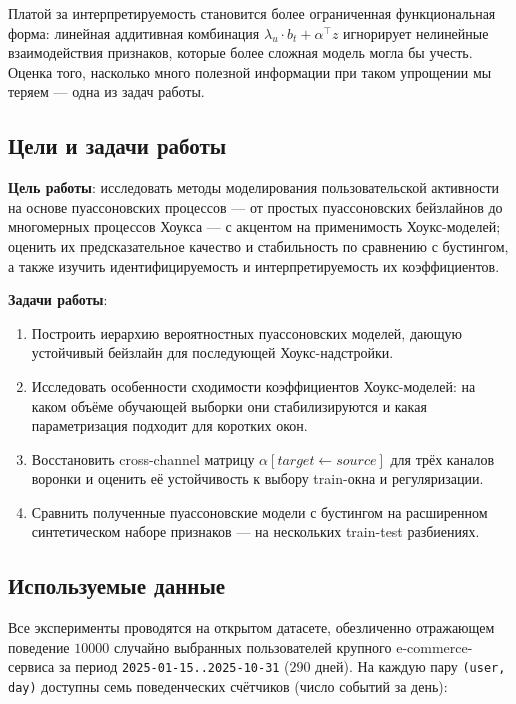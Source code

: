 \documentclass[12pt,a4paper]{article}
\begin{document}
Платой за интерпретируемость становится более ограниченная функциональная форма: линейная аддитивная комбинация $\lambda _u \cdot  b_t + \alpha ^{\top} z$ игнорирует нелинейные взаимодействия признаков, которые более сложная модель могла бы учесть. Оценка того, насколько много полезной информации при таком упрощении мы теряем --- одна из задач работы.

\FloatBarrier
\subsection{Цели и задачи работы}

\textbf{Цель работы}: исследовать методы моделирования пользовательской активности на основе пуассоновских процессов --- от простых пуассоновских бейзлайнов до многомерных процессов Хоукса --- с акцентом на применимость Хоукс-моделей; оценить их предсказательное качество и стабильность по сравнению с бустингом, а также изучить идентифицируемость и интерпретируемость их коэффициентов.

\textbf{Задачи работы}:

\begin{enumerate}
  \item Построить иерархию вероятностных пуассоновских моделей, дающую устойчивый бейзлайн для последующей Хоукс-надстройки.
  \item Исследовать особенности сходимости коэффициентов Хоукс-моделей: на каком объёме обучающей выборки они стабилизируются и какая параметризация подходит для коротких окон.
  \item Восстановить cross-channel матрицу $\alpha [target \leftarrow  source]$ для трёх каналов воронки и оценить её устойчивость к выбору train-окна и регуляризации.
  \item Сравнить полученные пуассоновские модели с бустингом на расширенном синтетическом наборе признаков --- на нескольких train-test разбиениях.
\end{enumerate}


\FloatBarrier
\subsection{Используемые данные}

Все эксперименты проводятся на открытом датасете, обезличенно отражающем поведение $10000$ случайно выбранных пользователей крупного e-commerce-сервиса за период \texttt{2025-01-15..2025-10-31} ($290$ дней). На каждую пару \texttt{(user, day)} доступны семь поведенческих счётчиков (число событий за день):
\end{document}
